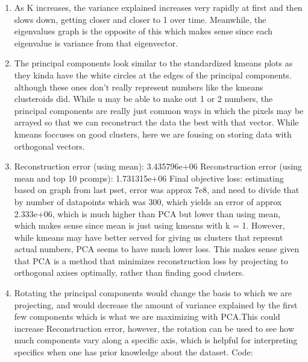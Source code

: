 \documentclass[submit]{harvardml}
\begin{document}
\begin{enumerate}
  \item As K increases, the variance explained increases very rapidly at first and then slows down, getting closer and closer to 1 over time. Meanwhile, the eigenvalues graph is the opposite of this which makes sense since each eigenvalue is variance from that eigenvector. 
  
  \item The principal components look similar to the standardized kmeans plots as they kinda have the white circles at the edges of the principal components. 
  although these ones don't really represent numbers like the kmeans clusteroids did. While u may be able to make out 1 or 2 numbers, the principal components are really just common ways in which the pixels may be arrayed so that we can reconstruct the data the best with that vector. While kmeans foccuses on good clusters, here we are fousing on storing data with orthogonal vectors. 
  
  \item Reconstruction error (using mean): 3.435796e+06
Reconstruction error (using mean and top 10 pcomps): 1.731315e+06
Final objective loss: estimating based on graph from last pset, error was approx 7e8, and need to divide that by number of datapoints which was 300, which yields an error of approx 2.333e+06, which is much higher than PCA but lower than using mean, which makes sense since mean is just using kmeans with k = 1. However, while kmeans may have better served for giving us clusters that represnt actual numbers, PCA seems to have much lower loss. This makes sense given that PCA is a method that minimizes reconstruction loss by projecting to orthogonal axises optimally, rather than finding good clusters. 

  \item Rotating the principal components would change the basis to which we are projecting, and would decrease the amount of variance explained by the first few components which is what we are maximizing with PCA.This could increase Reconstruction error, however, the rotation can be used to see how much components vary along a specific axis, which is helpful for interpreting specifics when one has prior knowledge about the dataset. 
Code:
\end{enumerate}

\newpage
\end{document}
